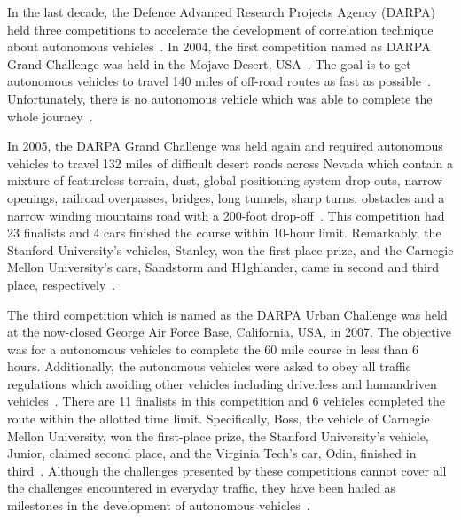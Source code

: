 \documentclass[conference]{IEEEtran}
\begin{document}
In the last decade, the Defence Advanced Research Projects Agency (DARPA) held three competitions to accelerate the development of correlation technique about autonomous vehicles~\cite{Brian2016}. In 2004, the first competition named as DARPA Grand Challenge was held in the Mojave Desert, USA~\cite{self_driving}. The goal is to get autonomous vehicles to travel 140 miles of off-road routes as fast as possible~\cite{Brian2016}. Unfortunately, there is no autonomous vehicle which was able to complete the whole journey~\cite{self_driving}.

In 2005, the DARPA Grand Challenge was held again and required autonomous vehicles to travel 132 miles of difficult desert roads across Nevada which contain a mixture of featureless terrain, dust, global positioning system drop-outs, narrow openings, railroad overpasses, bridges, long tunnels, sharp turns, obstacles and a narrow winding mountains road with a 200-foot drop-off~\cite{Buehler2007}. This competition had 23 finalists and 4 cars finished the course within 10-hour limit. Remarkably, the Stanford University's vehicles, Stanley, won the first-place prize, and the Carnegie Mellon University's cars, Sandstorm and H1ghlander, came in second and third place, respectively~\cite{Buehler2007}.

The third competition which is named as the DARPA Urban Challenge was held at the now-closed George Air Force Base, California, USA, in 2007. The objective was for a autonomous vehicles to complete the 60 mile course in less than 6 hours. Additionally, the autonomous vehicles were asked to obey all traffic regulations which avoiding other vehicles including driverless and humandriven vehicles~\cite{buehler2009darpa}. There are 11 finalists in this competition and 6 vehicles completed the route within the allotted time limit. Specifically, Boss, the vehicle of Carnegie Mellon University, won the first-place prize, the Stanford University's vehicle, Junior, claimed second place, and the Virginia Tech's car, Odin, finished in third~\cite{buehler2009darpa}. Although the challenges presented by these competitions cannot cover all the challenges encountered in everyday traffic, they have been hailed as milestones in the development of autonomous vehicles~\cite{Brian2016}.
\end{document}
